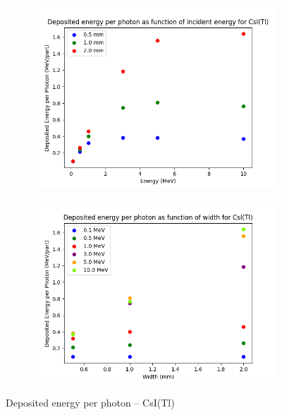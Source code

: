 \documentclass{article}
\begin{document}
\begin{figure}[H]
\centering
\begin{subfigure}{.5\textwidth}
  \centering
  \includegraphics[width=\linewidth]{images/task3/dep_en_CsI.png}
  \caption{}
\end{subfigure}%
\begin{subfigure}{.5\textwidth}
  \centering
  \includegraphics[width=\linewidth]{images/task3/dep_en_width_CsI.png}
  \caption{}
\end{subfigure}
\caption{Deposited energy per photon – CsI(Tl)}
\end{figure}
\end{document}
